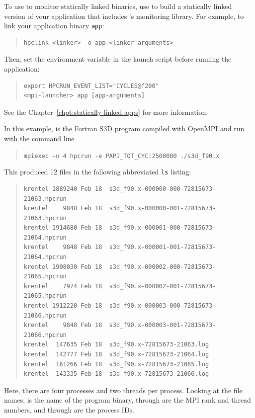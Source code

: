 \documentclass[11pt,twoside,letterpaper]{report}
\begin{document}
\vspace{1ex}


\answer{}
To use  \HPCToolkit{} to monitor  statically linked binaries, use \hpclink{} to build a statically linked version of your application that includes \HPCToolkit{}'s monitoring library.
For example, to link your application binary \texttt{app}:
%
\begin{quote}
\begin{verbatim}
hpclink <linker> -o app <linker-arguments>
\end{verbatim}
\end{quote}
%
Then, set the  environment variable in the launch script before running the application:
%
\begin{quote}
\begin{verbatim}
export HPCRUN_EVENT_LIST="CYCLES@f200"
<mpi-launcher> app [app-arguments]
\end{verbatim}
%
\end{quote}
See the Chapter~\ref{chpt:statically-linked-apps} for more information.

\vspace{1ex}


\answer{}
In this example,  is the Fortran S3D program compiled with OpenMPI and run with the command line
%
\begin{quote}
  \verb|mpiexec -n 4 hpcrun -e PAPI_TOT_CYC:2500000 ./s3d_f90.x|
\end{quote}
%
This produced 12 files in the following abbreviated \texttt{ls} listing:
%
\begin{quote}
\begin{verbatim}
krentel 1889240 Feb 18  s3d_f90.x-000000-000-72815673-21063.hpcrun
krentel    9848 Feb 18  s3d_f90.x-000000-001-72815673-21063.hpcrun
krentel 1914680 Feb 18  s3d_f90.x-000001-000-72815673-21064.hpcrun
krentel    9848 Feb 18  s3d_f90.x-000001-001-72815673-21064.hpcrun
krentel 1908030 Feb 18  s3d_f90.x-000002-000-72815673-21065.hpcrun
krentel    7974 Feb 18  s3d_f90.x-000002-001-72815673-21065.hpcrun
krentel 1912220 Feb 18  s3d_f90.x-000003-000-72815673-21066.hpcrun
krentel    9848 Feb 18  s3d_f90.x-000003-001-72815673-21066.hpcrun
krentel  147635 Feb 18  s3d_f90.x-72815673-21063.log
krentel  142777 Feb 18  s3d_f90.x-72815673-21064.log
krentel  161266 Feb 18  s3d_f90.x-72815673-21065.log
krentel  143335 Feb 18  s3d_f90.x-72815673-21066.log
\end{verbatim}
\end{quote}
%
Here, there are four processes and two threads per process.
Looking at the file names,  is the name of the program binary,  through  are the MPI rank and thread numbers, and  through  are the process IDs.
\end{document}
